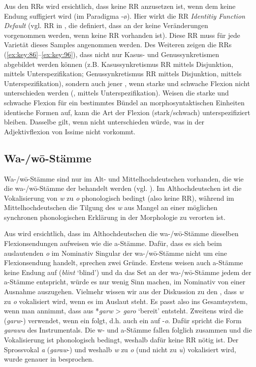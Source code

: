 Aus den RRs wird ersichtlich, dass keine RR anzusetzen ist, wenn dem  keine Endung suffigiert wird (im Paradigma -ø). Hier wirkt die RR \textit{Identitiy Function Default} (vgl. RR  in , die definiert, dass an der  keine Veränderungen vorgenommen werden, wenn keine RR vorhanden ist). Diese RR muss für jede Varietät dieses Samples angenommen werden. Des Weiteren zeigen die RRs (\ref{ex:key:86}--\ref{ex:key:96}), dass nicht nur Kasus- und Genussynkretismen abgebildet werden können (z.B. Kasussynkretismus RR  mittels Disjunktion,  mittels Unterspezifikation; Genussynkretismus RR  mittels Disjunktion,  mittels Unterspezifikation), sondern auch jener , wenn starke und schwache Flexion nicht unterschieden werden (, mittels Unterspezifikation). Weisen die starke und schwache Flexion für ein bestimmtes Bündel an morphosyntaktischen Einheiten identische Formen auf, kann die Art der Flexion (stark/schwach) unterspezifiziert bleiben. Dasselbe gilt, wenn  nicht unterschieden würde, was in der Adjektivflexion von Issime nicht vorkommt.

\subsection{Wa-/w\=o-Stämme}\label{5.2.2}

Wa-/w\=o-Stäm\-me sind nur im Alt- und Mittelhochdeutschen vorhanden, die wie die wa-/w\=o-Stäm\-me der  behandelt werden (vgl. ). Im Althochdeutschen ist die Vokalisierung von \textit{w} zu \textit{o} phonologisch bedingt (also keine RR), während im Mittelhochdeutschen die Tilgung des \textit{w} aus Mangel an einer möglichen synchronen phonologischen Erklärung in der Morphologie zu verorten ist.

Aus  wird ersichtlich, dass im Althochdeutschen die wa-/w\=o-Stäm\-me dieselben Flexionsendungen aufweisen wie die a-Stäm\-me. Dafür, dass es sich beim auslautenden \textit{o} im Nominativ Singular der wa-/w\=o-Stäm\-me nicht um eine Flexionsendung handelt, sprechen zwei Gründe. Erstens weisen auch a-Stäm\-me keine Endung auf (\textit{blint} ‘blind’) und da das Set an  der wa-/w\=o-Stäm\-me jedem der a-Stäm\-me entspricht, würde es nur wenig Sinn machen, im Nominativ von einer Ausnahme auszugehen. Vielmehr wissen wir aus der Diskussion zu den , dass \textit{w} zu \textit{o} vokalisiert wird, wenn es im Auslaut steht. Es passt also ins Gesamtsystem, wenn man annimmt, dass aus *\textit{garw} > \textit{garo} ‘bereit’ entsteht. Zweitens wird die  (\textit{garw}-) verwendet, wenn ein  folgt, d.h. auch ein  auf -\textit{o}. Dafür spricht die Form \textit{garawu} des Instrumentals. Die w- und a-Stäm\-me fallen folglich zusammen und die Vokalisierung ist phonologisch bedingt, weshalb dafür keine RR nötig ist. Der Sprossvokal \textit{a} (\textit{gara}\textit{w}-) und weshalb \textit{w} zu \textit{o} (und nicht zu \textit{u}) vokalisiert wird, wurde genauer in  besprochen.

